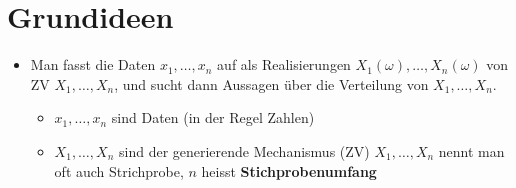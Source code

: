 
\section{Grundideen}
\begin{itemize}
    \item Man fasst die Daten $x_1, \dots, x_n$ auf als Realisierungen $X_1(\omega), \dots, X_n(\omega)$ von ZV $X_1, \dots, X_n$, und sucht dann Aussagen über die Verteilung von $X_1, \dots, X_n$.
        \begin{itemize}
            \item $x_1, \dots, x_n$ sind Daten (in der Regel Zahlen)
            \item $X_1, \dots, X_n$ sind der generierende Mechanismus (ZV)
             $X_1, \dots, X_n$ nennt man oft auch Strichprobe, $n$ heisst \textbf{Stichprobenumfang}
        \end{itemize}
\end{itemize}
